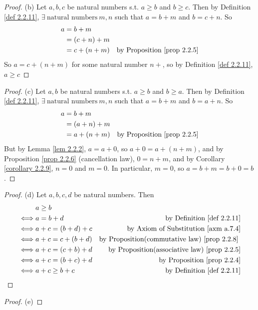 \begin{proof}{(b)}
Let \(a, b, c\) be natural numbers s.t. \(a \geq b\) and \(b \geq c\). Then by Definition \ref{def 2.2.11}, \(\exists\ \text{natural numbers}\ m, n\) such that \(a = b + m\) and \(b = c + n\). So
\begin{align*}
    a & = b + m & \\
      & = (c + n) + m & \\
      & = c + (n + m) & \text{by Proposition \ref{prop 2.2.5}}\\
\end{align*}
So \(a = c + (n + m)\) for some natural number \(n + \), so by Definition \ref{def 2.2.11}, \(a \geq c\)
\end{proof}
\begin{proof}{(c)}
Let \(a, b\) be natural numbers s.t. \(a \geq b\) and \(b \geq a\). Then by Definition \ref{def 2.2.11}, \(\exists\ \text{natural numbers}\ m, n\) such that \(a = b + m\) and \(b = a + n\). So
\begin{align*}
    a & = b + m & \\
      & = (a + n) + m & \\
      & = a + (n + m) & \text{by Proposition \ref{prop 2.2.5}}\\
\end{align*}
But by Lemma \ref{lem 2.2.2}, \(a = a + 0\), so \(a + 0 = a + (n + m)\), and by Proposition \ref{prop 2.2.6} (cancellation law), \(0 = n + m\), and by Corollary \ref{corollary 2.2.9}, \(n = 0\) and \(m = 0\). In particular, \(m = 0\), so \(a = b + m = b + 0 = b\).
\end{proof}
\begin{proof}{(d)}
Let \(a, b, c, d\) be natural numbers. Then
\begin{align*}
         & a \geq b \\
    \iff & a = b + d             & \text{by Definition \ref{def 2.2.11}} \\
    \iff & a + c = (b + d) + c   & \text{by Axiom of Substitution \ref{axm a.7.4}} \\ 
    \iff & a + c = c + (b + d)   & \text{by Proposition(commutative law) \ref{prop 2.2.8} } \\
    \iff & a + c = (c + b) + d   & \text{by Proposition(associative law) \ref{prop 2.2.5}} \\
    \iff & a + c = (b + c) + d   & \text{by Proposition \ref{prop 2.2.4}} \\
    \iff & a + c \geq b + c      & \text{by Definition \ref{def 2.2.11}}
\end{align*}
\end{proof}
\begin{proof}{(e)}

\end{proof}